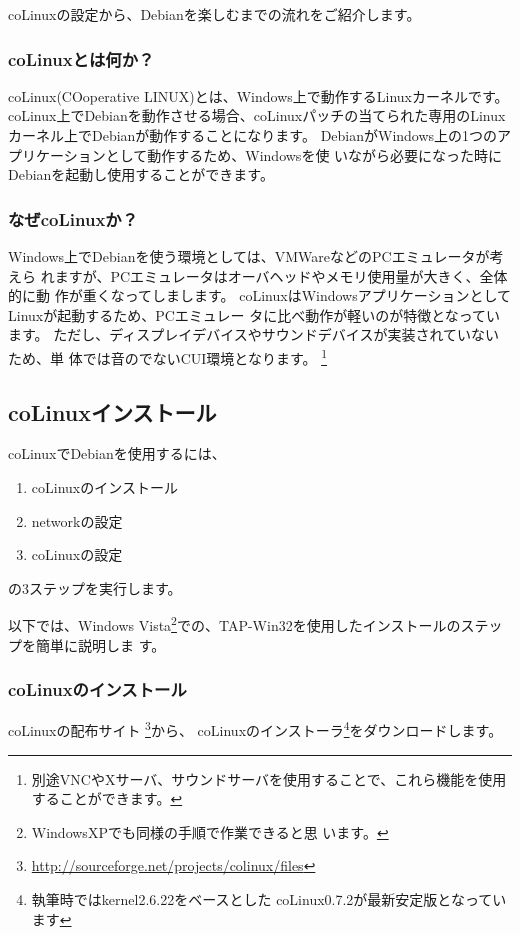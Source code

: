 \documentclass[mingoth,a4paper]{jsarticle}
\begin{document}
coLinuxの設定から、Debianを楽しむまでの流れをご紹介します。

\subsubsection{coLinuxとは何か？}
coLinux(COoperative LINUX)とは、Windows上で動作するLinuxカーネルです。
coLinux上でDebianを動作させる場合、coLinuxパッチの当てられた専用のLinux
カーネル上でDebianが動作することになります。
DebianがWindows上の1つのアプリケーションとして動作するため、Windowsを使
いながら必要になった時にDebianを起動し使用することができます。

\subsubsection{なぜcoLinuxか？}
Windows上でDebianを使う環境としては、VMWareなどのPCエミュレータが考えら
れますが、PCエミュレータはオーバヘッドやメモリ使用量が大きく、全体的に動
作が重くなってしまします。
coLinuxはWindowsアプリケーションとしてLinuxが起動するため、PCエミュレー
タに比べ動作が軽いのが特徴となっています。
ただし、ディスプレイデバイスやサウンドデバイスが実装されていないため、単
体では音のでないCUI環境となります。
\footnote{別途VNCやXサーバ、サウンドサーバを使用することで、これら機能を使用することができます。}

\subsection{coLinuxインストール}
coLinuxでDebianを使用するには、
\begin{enumerate}
\item coLinuxのインストール
\item networkの設定
\item coLinuxの設定
\end{enumerate}
の3ステップを実行します。

以下では、Windows Vista\footnote{WindowsXPでも同様の手順で作業できると思
います。}での、TAP-Win32を使用したインストールのステップを簡単に説明しま
す。


\subsubsection{coLinuxのインストール}
coLinuxの配布サイト
\footnote{\url{http://sourceforge.net/projects/colinux/files}}から、
coLinuxのインストーラ\footnote{執筆時ではkernel2.6.22をベースとした
coLinux0.7.2が最新安定版となっています}をダウンロードします。
\end{document}
